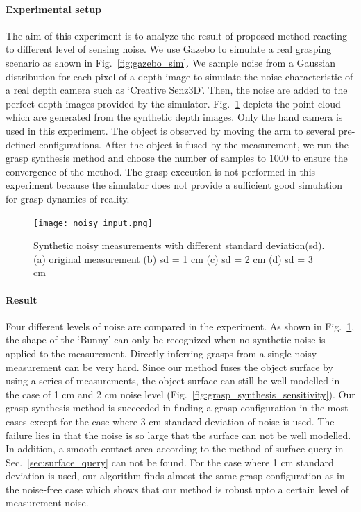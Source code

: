 \paragraph {Experimental setup} The aim of this experiment is to analyze the result of proposed method reacting to different level of sensing noise. We use Gazebo to simulate a real grasping scenario as shown in Fig.~\ref{fig:gazebo_sim}. We sample noise from a Gaussian distribution for each pixel of a depth image to simulate the noise characteristic of a real depth camera such as `Creative Senz3D'. Then, the noise are added to the perfect depth images provided by the simulator. Fig.~\ref{fig:noise} depicts the point cloud which are generated from the synthetic depth images. Only the hand camera is used in this experiment. The object is observed by moving the arm to several pre-defined configurations. After the object is fused by the measurement, we run the grasp synthesis method and choose the number of samples to 1000 to ensure the convergence of the method. The grasp execution is not performed in this experiment because the simulator does not provide a sufficient good simulation for grasp dynamics of reality. 
\begin{figure}[!htbp] 
\centering
\texttt{[image: noisy\_input.png]}%
\caption{Synthetic noisy measurements with different standard deviation(sd). (a) original measurement (b) sd = 1 cm (c) sd = 2 cm (d) sd = 3 cm}
\label{fig:noise}
\end{figure}	
\paragraph{Result} 
Four different levels of noise are compared in the experiment. As shown in Fig.~\ref{fig:noise}, the shape of the `Bunny' can only be recognized when no synthetic noise is applied to the measurement. Directly inferring grasps from a single noisy measurement can be very hard. Since our method fuses the object surface by using a series of measurements, the object surface can still be well modelled in the case of 1 cm and 2 cm noise level (Fig.~\ref{fig:grasp_synthesis_sensitivity}). Our grasp synthesis method is succeeded in finding a grasp configuration in the most cases except for the case where 3 cm standard deviation of noise is used.  The failure lies in that the noise is so large that the surface can not be well modelled. In addition, a smooth contact area according to the method of surface query in Sec.~\ref{sec:surface_query} can not be found. For the case where 1 cm standard deviation is used, our algorithm finds almost the same grasp configuration as in the noise-free case which shows that our method is robust upto a certain level of measurement noise. 


